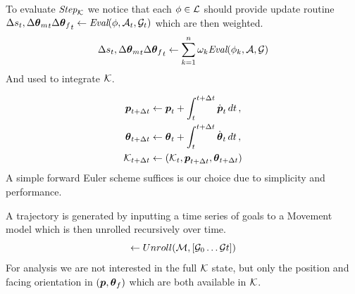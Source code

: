 
To evaluate $\textit{Step}_{\mathcal{K}}$ we notice that each $\phi\in\mathcal{L}$ should provide update routine $\Delta{s}_t, {\Delta{ \boldsymbol{\theta } }_m}_t {\Delta{ \boldsymbol{\theta } }_f}_t \leftarrow \textit{Eval}(\phi, \mathcal{A}_t,\mathcal{G}_t)$ which are then weighted.
\begin{subequations}

\begin{align}
\Delta{s}_t, {\Delta{ \boldsymbol{\theta } }_m}_t {\Delta{ \boldsymbol{\theta } }_f}_t &\leftarrow \sum_{k=1}^{n}\omega_k \textit{Eval}(\phi_{k},\mathcal{A},\mathcal{G})\\
\end{align}
\end{subequations}
And used to integrate $\mathcal{K}$.

\begin{subequations}
\begin{align}
    \boldsymbol{p }_{t+\Delta t} &\leftarrow \boldsymbol{p }_t + \int_{t}^{t+\Delta t} \dot{\boldsymbol{p }}_t\,dt \,, \label{eq:time:int:pos}\\
    \boldsymbol{\theta }_{t+\Delta t} &\leftarrow \boldsymbol{\theta }_t + \int_{t}^{t+\Delta t} \dot{\boldsymbol{\theta }}_t\,dt\,, \label{eq:time:int:orientation}\\
    \mathcal{K}_{t+\Delta{t}} &\leftarrow (\mathcal{K}_t, \boldsymbol{p }_{t+\Delta t}, \boldsymbol{\theta }_{t+\Delta t})
\end{align}
\end{subequations}
A simple forward Euler scheme suffices is our choice due to simplicity and performance.

A trajectory is generated by inputting a time series of goals to a Movement model which is then unrolled recursively over time.
\begin{equation}
    [\kine_0 \ldots \kine_t] \leftarrow Unroll(\model,[\goals_{0} \dots \goals{t}])
\end{equation}
For analysis we are not interested in the full $\mathcal{K}$ state, but only the position and facing orientation in $(\boldsymbol{p }, \boldsymbol{\theta }_f)$ which are both available in $\mathcal{K}$. 


